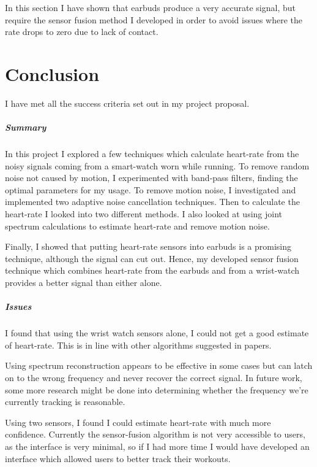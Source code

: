 \documentclass[12pt,a4paper,twoside,openright]{report}
\begin{document}
In this section I have shown that earbuds produce a very accurate signal, but
require the sensor fusion method I developed in order to avoid issues where
the rate drops to zero due to lack of contact.

\chapter{Conclusion}

I have met all the success criteria set out in my project proposal.

\paragraph{Summary}

In this project I explored a few techniques which calculate heart-rate from
the noisy signals coming from a smart-watch worn while running. To remove
random noise not caused by motion, I experimented with band-pass filters,
finding the optimal parameters for my usage. To remove motion noise, I
investigated and implemented two adaptive noise cancellation techniques. Then
to calculate the heart-rate I looked into two different methods. I also
looked at using joint spectrum calculations to estimate heart-rate and remove
motion noise.

Finally, I showed that putting heart-rate sensors into earbuds is a promising
technique, although the signal can cut out. Hence, my developed sensor fusion
technique which combines heart-rate from the earbuds and from a wrist-watch
provides a better signal than either alone.

\paragraph{Issues}

I found that using the wrist watch sensors alone, I could not get a 
good estimate of heart-rate. This is in line with other algorithms suggested
in papers.

Using spectrum reconstruction appears to be effective in some cases but can
latch on to the wrong frequency and never recover the correct signal. In
future work, some more research might be done into determining whether the
frequency we're currently tracking is reasonable.

Using two sensors, I found I could estimate heart-rate with much more
confidence. Currently the sensor-fusion algorithm is not very accessible to
users, as the interface is very minimal, so if I had more time I would have
developed an interface which allowed users to better track their workouts.
\end{document}
